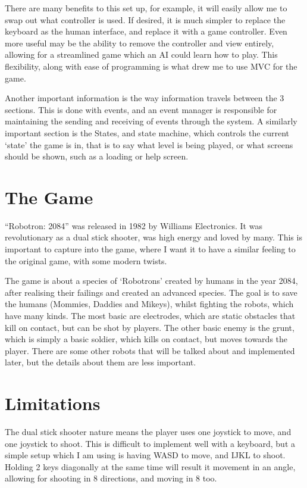 \documentclass[a4paper, 11pt]{report}
\begin{document}
There are many benefits to this set up, for example, it will easily allow me to swap out what controller is used. If desired, it is much simpler to replace the keyboard as the human interface, and replace it with a game controller. Even more useful may be the ability to remove the controller and view entirely, allowing for a streamlined game which an AI could learn how to play. This flexibility, along with ease of programming is what drew me to use MVC for the game.

Another important information is the way information travels between the 3 sections. This is done with events, and an event manager is responsible for maintaining the sending and receiving of events through the system. A similarly important section is the States, and state machine, which controls the current ‘state’ the game is in, that is to say what level is being played, or what screens should be shown, such as a loading or help screen.

\section{The Game}
“Robotron: 2084” was released in 1982 by Williams Electronics. It was revolutionary as a dual stick shooter, was high energy and loved by many. This is important to capture into the game, where I want it to have a similar feeling to the original game, with some modern twists. 

The game is about a species of ‘Robotrons’ created by humans in the year 2084, after realising their failings and created an advanced species. The goal is to save the humans (Mommies, Daddies and Mikeys), whilst fighting the robots, which have many kinds. The most basic are electrodes, which are static obstacles that kill on contact, but can be shot by players. The other basic enemy is the grunt, which is simply a basic soldier, which kills on contact, but moves towards the player.
There are some other robots that will be talked about and implemented later, but the details about them are less important. 

\section{Limitations}
The dual stick shooter nature means the player uses one joystick to move, and one joystick to shoot. This is difficult to implement well with a keyboard, but a simple setup which I am using is having WASD to move, and IJKL to shoot. Holding 2 keys diagonally at the same time will result it movement in an angle, allowing for shooting in 8 directions, and moving in 8 too.
\end{document}
